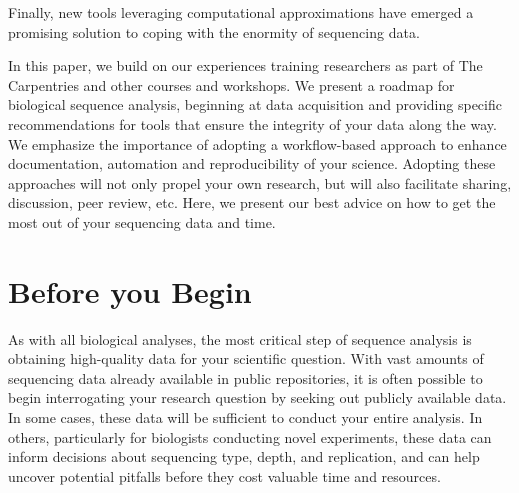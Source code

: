 \documentclass[10pt,letterpaper]{article}
\begin{document}
Finally, new tools leveraging computational approximations have emerged a promising solution to coping with the enormity of sequencing data.


In this paper, we build on our experiences training researchers as part of The Carpentries and other courses and workshops. 
We present a roadmap for biological sequence analysis, beginning at data acquisition and providing specific recommendations for tools that ensure the integrity of your data along the way.
We emphasize the importance of adopting a workflow-based approach to enhance documentation, automation and reproducibility of your science.
Adopting these approaches will not only propel your own research, but will also facilitate sharing, discussion, peer review, etc. 
Here, we present our best advice on how to get the most out of your sequencing data and time.

%


\section*{Before you Begin}

As with all biological analyses, the most critical step of sequence analysis is obtaining high-quality data for your scientific question. 
With vast amounts of sequencing data already available in public repositories, it is often possible to begin interrogating your research question by seeking out publicly available data. 
In some cases, these data will be sufficient to conduct your entire analysis. 
In others, particularly for biologists conducting novel experiments, these data can inform decisions about sequencing type, depth, and replication, and can help uncover potential pitfalls before they cost valuable time and resources.
\end{document}
